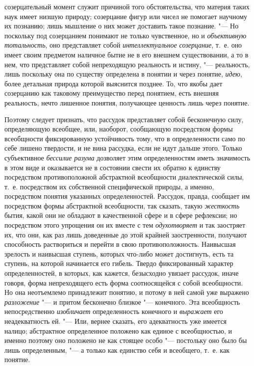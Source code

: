 {созерцательный момент служит причиной того обстоятельства, что материя
таких наук имеет низшую природу; созерцание фигур или чисел не помогает
научному их познанию; лишь мышление о них может доставить такое познание.
"--- Но поскольку под созерцанием понимают не только
чувственное, но и {\em объективную
тотальность}, оно представляет собой
{\em интеллектуальное созерцание},
т.~е. оно имеет своим предметом наличное бытие не в его
внешнем существовании, а то в нем, что представляет собой непреходящую
реальность и истину, "--- реальность, лишь поскольку она по
существу определена в понятии и через понятие,
{\em идею}, более
детальная природа которой выяснится позднее. То, что якобы дает созерцанию
как таковому преимущество перед понятием, есть внешняя реальность, нечто
лишенное понятия, получающее ценность лишь через понятие.

Поэтому следует признать, что рассудок представляет собой
бесконечную силу, определяющую всеобщее, или, наоборот, сообщающую
посредством формы всеобщности фиксированную устойчивость тому, что в
определенности само по себе лишено твердости, и не вина
рассудка, если не идут дальше этого. Только субъективное
{\em бессилие разума}
дозволяет этим определенностям иметь значимость в этом виде и
оказывается не в состоянии свести их обратно к единству посредством
противоположной абстрактной всеобщности диалектической силы, т.~е.
посредством их собственной специфической природы, а именно, посредством
понятия указанных определенностей. Рассудок, правда, сообщает им
посредством формы абстрактной всеобщности, так сказать, такую
{\em жесткость} бытия,
какой они не обладают в качественной сфере и в сфере рефлексии; но
посредством этого упрощения он их вместе с тем
{\em одухотворяет} и так
заостряет их, что они, как раз лишь доведенные до этой крайней
заостренности, получают способность раствориться и перейти в свою
противоположность. Наивысшая зрелость и наивысшая ступень, которых что-либо
может достигнуть, есть та ступень, на которой начинается его гибель. Твердо
фиксированный характер определенностей, в которых, как кажется, безысходно
увязает рассудок, иначе говоря, форма непреходящего есть форма
соотносящейся с собой всеобщности. Но она неотъемлемо принадлежит понятию,
и потому в ней самой уже выражено
{\em разложение} "--- и
притом бесконечно близкое "--- конечного. Эта всеобщность
непосредственно {\em изобличает}
определенность конечного и
{\em выражает} его
неадекватность ей. "--- Или, вернее сказать, его адекватность
уже имеется налицо; абстрактное определенное положено как единое с
всеобщностью, и именно поэтому оно положено не как стоящее особо
"--- постольку оно было бы лишь определенным, "--- а
только как единство себя и всеобщего, т.~е. как понятие.

}
